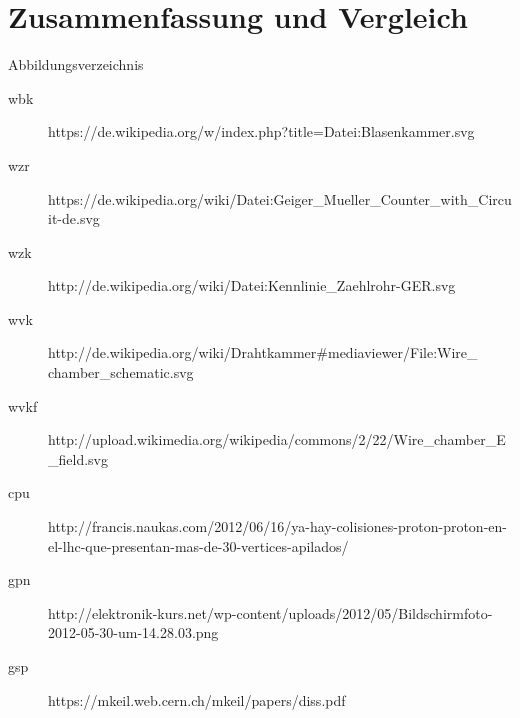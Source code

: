 \documentclass{beamer}
\begin{document}
\section{Zusammenfassung und Vergleich}




\begin{frame}{Abbildungsverzeichnis}
	\begin{adjustwidth}{-5em}{-2em}
	  	\begin{description}
		  	\item[wbk]
		  	https://de.wikipedia.org/w/index.php?title=Datei:Blasenkammer.svg
		  	\item[wzr]
		  	https://de.wikipedia.org/wiki/Datei:Geiger\_Mueller\_Counter\_with\_Circuit-de.svg
		  	\item[wzk]
			http://de.wikipedia.org/wiki/Datei:Kennlinie\_Zaehlrohr-GER.svg
			\item[wvk]
		  	http://de.wikipedia.org/wiki/Drahtkammer\#mediaviewer/File:Wire\_ chamber\_schematic.svg
		  	\item[wvkf]
		  	http://upload.wikimedia.org/wikipedia/commons/2/22/Wire\_chamber\_E\_field.svg
		  	\item[cpu]
		  	http://francis.naukas.com/2012/06/16/ya-hay-colisiones-proton-proton-en-el-lhc-que-presentan-mas-de-30-vertices-apilados/
		  	\item[gpn]
		  	http://elektronik-kurs.net/wp-content/uploads/2012/05/Bildschirmfoto-2012-05-30-um-14.28.03.png
		  	\item[gsp]
		  	https://mkeil.web.cern.ch/mkeil/papers/diss.pdf
		\end{description}
	\end{adjustwidth}  
\end{frame}
\end{document}
